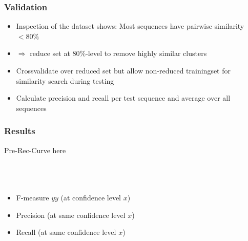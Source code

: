 \documentclass{beamer}
\begin{document}
\begin{frame}
	\frametitle{Validation}
	
	\begin{itemize}
		\item Inspection of the dataset shows: Most sequences have pairwise similarity $< 80\%$
		\item[] $\Rightarrow$ reduce set at $80\%$-level to remove highly similar clusters
		\item Crossvalidate over reduced set but allow non-reduced trainingset for similarity search during testing
		\item Calculate precision and recall per test sequence and average over all sequences
	\end{itemize}
\end{frame}

\begin{frame}
	\frametitle{Results}
	Pre-Rec-Curve here\\
	\hfill\\
	\hfill\\
	\hfill\\
	\begin{itemize}
		\item F-measure $yy$ (at confidence level $x$)
		\item Precision (at same confidence level $x$)
		\item Recall (at same confidence level $x$)
	\end{itemize}		
	
\end{frame}
\end{document}
